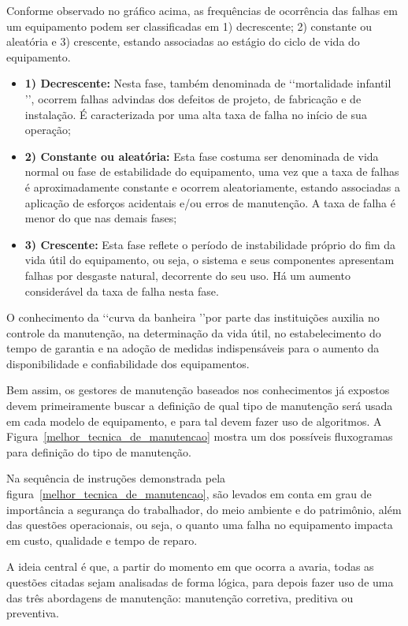 Conforme observado no gráfico acima, as frequências de ocorrência das falhas em um equipamento podem ser classificadas em 1) decrescente; 2) constante ou aleatória e 3) crescente, estando associadas ao estágio do ciclo de vida do equipamento.

\begin{itemize}
	\item \textbf{1) Decrescente:} Nesta fase, também denominada de \lq\lq mortalidade infantil \rq\rq, ocorrem falhas advindas dos defeitos de projeto, de fabricação e de instalação. É caracterizada por uma alta taxa de falha no início de sua operação;
	\item \textbf{2) Constante ou aleatória:} Esta fase costuma ser denominada de vida normal ou fase de estabilidade do equipamento, uma vez que a taxa de falhas é aproximadamente constante e ocorrem aleatoriamente, estando associadas a aplicação de esforços acidentais e/ou erros de manutenção. A taxa de falha é menor do que nas demais fases;
	\item \textbf{3) Crescente:} Esta fase reflete o período de instabilidade próprio do fim da vida útil do equipamento, ou seja, o sistema e seus componentes apresentam falhas por desgaste natural, decorrente do seu uso. Há um aumento considerável da taxa de falha nesta fase.  
\end{itemize} 

O conhecimento da \lq\lq curva da banheira \rq\rq por parte das instituições auxilia no controle da manutenção, na determinação da vida útil, no estabelecimento do tempo de garantia e na adoção de medidas indispensáveis para o aumento da disponibilidade e confiabilidade dos equipamentos.

Bem assim, os gestores de manutenção baseados nos conhecimentos já expostos devem primeiramente buscar a definição de qual tipo de manutenção será usada em cada modelo de equipamento, e para tal devem fazer uso de algoritmos. A Figura~\ref{melhor_tecnica_de_manutencao} mostra um dos possíveis fluxogramas para definição do tipo de manutenção.

Na sequência de instruções demonstrada pela figura~\ref{melhor_tecnica_de_manutencao}, são levados em conta em grau de importância a segurança do trabalhador, do meio ambiente e do patrimônio, além das questões operacionais, ou seja, o quanto uma falha no equipamento impacta em custo, qualidade e tempo de reparo.

A ideia central é que, a partir do momento em que ocorra a avaria, todas as questões citadas sejam analisadas de forma lógica, para depois fazer uso de uma das três abordagens de manutenção: manutenção corretiva, preditiva ou preventiva.

